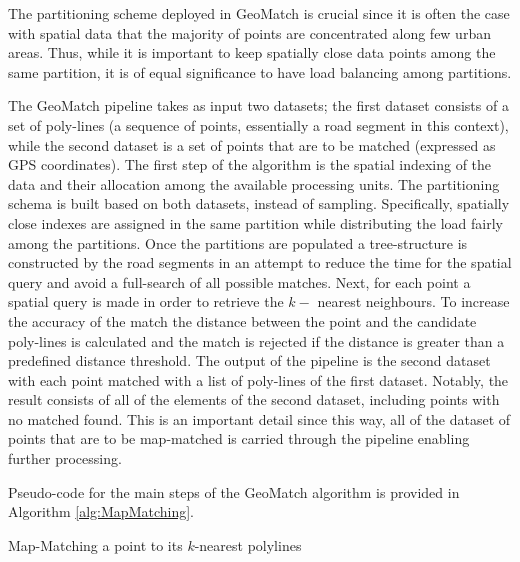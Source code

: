\documentclass[12pt]{article}
\theoremstyle{definition}
\begin{document}
The partitioning scheme deployed in GeoMatch is crucial since it is often the case with spatial data that the majority of points are concentrated along few urban areas. Thus, while it is important to keep spatially close data points among the same partition, it is of equal significance to have load balancing among partitions. 

The GeoMatch pipeline takes as input two datasets; the first dataset consists of a set of poly-lines (a sequence of points, essentially a road segment in this context), while the second dataset is a set of points that are to be matched (expressed as GPS coordinates). The first step of the algorithm is the spatial indexing of the data and their allocation among the available processing units. The partitioning schema is built based on both datasets, instead of sampling. Specifically, spatially close indexes are assigned in the same partition while distributing the load fairly among the partitions. Once the partitions are populated a tree-structure is constructed by the road segments in an attempt to reduce the time for the spatial query and avoid a full-search of all possible matches. Next, for each point a spatial query is made in order to retrieve the $k-$ nearest neighbours. To increase the accuracy of the match the distance between the point and the candidate poly-lines is calculated and the match is rejected if the distance is greater than a predefined distance threshold. The output of the pipeline is the second dataset with each point matched with a list of poly-lines of the first dataset. Notably, the result consists of all of the elements of the second dataset, including points with no matched found. This is an important detail since this way, all of the dataset of points that are to be map-matched is carried through the pipeline enabling further processing.

Pseudo-code for the main steps of the GeoMatch algorithm is provided in Algorithm \ref{alg:MapMatching}. 

\begin{algorithm}
  \caption{Map-Matching a point to its $k$-nearest polylines}
  \label{alg:MapMatching}
  \begin{algorithmic}
        \EndProcedure
        \EndProcedure
        \EndProcedure
      \Else 
      \EndIf
    \EndFor  
    \EndProcedure
  \end{algorithmic}
\end{algorithm}
\end{document}
